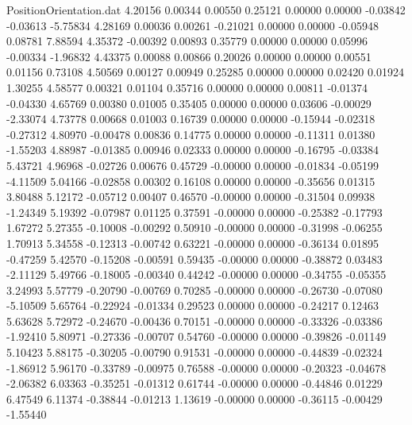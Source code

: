 \begin{filecontents}{PositionOrientation.dat}
   4.20156    0.00344    0.00550     0.25121    0.00000    0.00000   -0.03842   -0.03613   -5.75834
   4.28169    0.00036    0.00261    -0.21021    0.00000    0.00000   -0.05948    0.08781    7.88594
   4.35372   -0.00392    0.00893     0.35779    0.00000    0.00000    0.05996   -0.00334   -1.96832
   4.43375    0.00088    0.00866     0.20026    0.00000    0.00000    0.00551    0.01156    0.73108
   4.50569    0.00127    0.00949     0.25285    0.00000    0.00000    0.02420    0.01924    1.30255
   4.58577    0.00321    0.01104     0.35716    0.00000    0.00000    0.00811   -0.01374   -0.04330
   4.65769    0.00380    0.01005     0.35405    0.00000    0.00000    0.03606   -0.00029   -2.33074
   4.73778    0.00668    0.01003     0.16739    0.00000    0.00000   -0.15944   -0.02318   -0.27312
   4.80970   -0.00478    0.00836     0.14775    0.00000    0.00000   -0.11311    0.01380   -1.55203
   4.88987   -0.01385    0.00946     0.02333    0.00000    0.00000   -0.16795   -0.03384    5.43721
   4.96968   -0.02726    0.00676     0.45729   -0.00000    0.00000   -0.01834   -0.05199   -4.11509
   5.04166   -0.02858    0.00302     0.16108    0.00000    0.00000   -0.35656    0.01315    3.80488
   5.12172   -0.05712    0.00407     0.46570   -0.00000    0.00000   -0.31504    0.09938   -1.24349
   5.19392   -0.07987    0.01125     0.37591   -0.00000    0.00000   -0.25382   -0.17793    1.67272
   5.27355   -0.10008   -0.00292     0.50910   -0.00000    0.00000   -0.31998   -0.06255    1.70913
   5.34558   -0.12313   -0.00742     0.63221   -0.00000    0.00000   -0.36134    0.01895   -0.47259
   5.42570   -0.15208   -0.00591     0.59435   -0.00000    0.00000   -0.38872    0.03483   -2.11129
   5.49766   -0.18005   -0.00340     0.44242   -0.00000    0.00000   -0.34755   -0.05355    3.24993
   5.57779   -0.20790   -0.00769     0.70285   -0.00000    0.00000   -0.26730   -0.07080   -5.10509
   5.65764   -0.22924   -0.01334     0.29523    0.00000    0.00000   -0.24217    0.12463    5.63628
   5.72972   -0.24670   -0.00436     0.70151   -0.00000    0.00000   -0.33326   -0.03386   -1.92410
   5.80971   -0.27336   -0.00707     0.54760   -0.00000    0.00000   -0.39826   -0.01149    5.10423
   5.88175   -0.30205   -0.00790     0.91531   -0.00000    0.00000   -0.44839   -0.02324   -1.86912
   5.96170   -0.33789   -0.00975     0.76588   -0.00000    0.00000   -0.20323   -0.04678   -2.06382
   6.03363   -0.35251   -0.01312     0.61744   -0.00000    0.00000   -0.44846    0.01229    6.47549
   6.11374   -0.38844   -0.01213     1.13619   -0.00000    0.00000   -0.36115   -0.00429   -1.55440

\end{filecontents}
